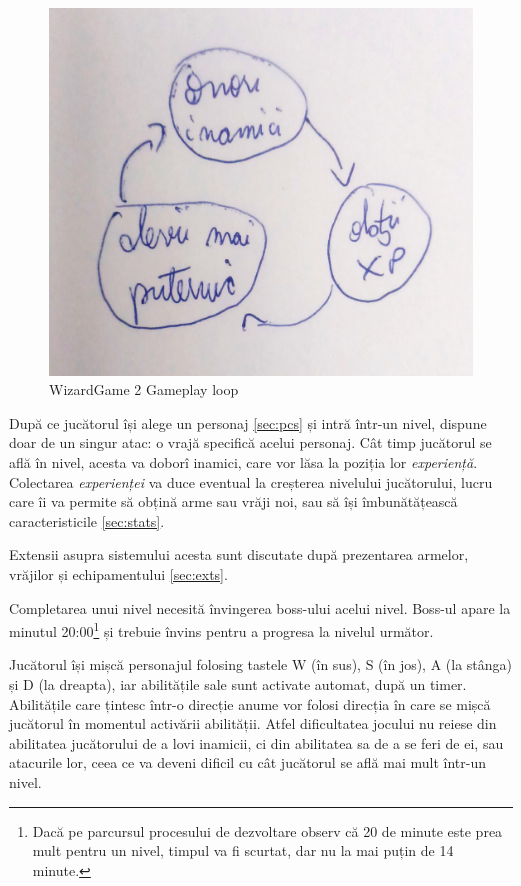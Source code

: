 \documentclass{article}
\begin{document}
    \begin{figure}[h]
        \includegraphics[scale=0.125]{gameplayloop}
        \centering
        \caption{WizardGame 2 Gameplay loop}
    \end{figure}

    După ce jucătorul își alege un personaj \ref{sec:pcs} și intră într-un nivel, dispune
    doar de un singur atac: o vrajă specifică acelui personaj. Cât timp jucătorul se află
    în nivel, acesta va doborî inamici, care vor lăsa la poziția lor \emph{experiență}.
    Colectarea \emph{experienței} va duce eventual la creșterea nivelului jucătorului, lucru
    care îi va permite să obțină arme sau vrăji noi, sau să își îmbunătățească caracteristicile
    \ref{sec:stats}.

    Extensii asupra sistemului acesta sunt discutate după prezentarea armelor, vrăjilor și
    echipamentului \ref{sec:exts}.

    Completarea unui nivel necesită învingerea boss-ului acelui nivel. Boss-ul apare la
    minutul 20:00\footnote{Dacă pe parcursul procesului de dezvoltare observ că 20 de
    minute este prea mult pentru un nivel, timpul va fi scurtat, dar nu la mai puțin de
    14 minute.} și trebuie învins pentru a progresa la nivelul următor.

    Jucătorul își mișcă personajul folosing tastele W (în sus), S (în jos), A (la stânga) și D
    (la dreapta), iar abilitățile sale sunt activate automat, după un timer. Abilitățile care
    țintesc într-o direcție anume vor folosi direcția în care se mișcă jucătorul în momentul
    activării abilității. Atfel dificultatea jocului nu reiese din abilitatea jucătorului de a lovi
    inamicii, ci din abilitatea sa de a se feri de ei, sau atacurile lor, ceea ce va deveni dificil
    cu cât jucătorul se află mai mult într-un nivel.
\end{document}
